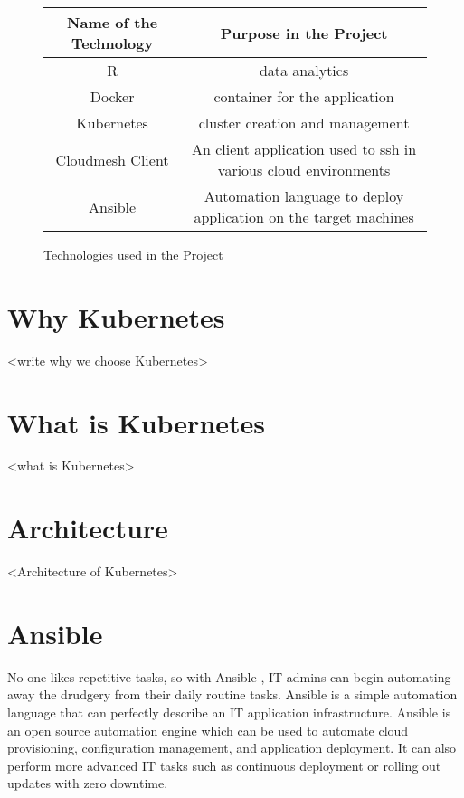 \documentclass[9pt,twocolumn,twoside]{../../styles/osajnl}
\begin{document}
\begin{figure}[ht]
\begin{center}
 \begin{tabular}{|c | c|} 
 \hline
Name of the Technology & Purpose in the Project \\ [0.5ex] 
 \hline\hline
    
R & data analytics \\
\hline

Docker & container for the application \\
\hline

Kubernetes & cluster creation and management \\[1ex]
\hline

Cloudmesh Client & An client application used to ssh in various cloud
environments \\[1ex]

\hline
Ansible & Automation language to deploy
application on the target machines \\[1ex]
\hline

\end{tabular}
\end{center}
  \caption{Technologies used in the Project}
\end{figure}

\section{Why Kubernetes}
<write why we choose Kubernetes>

\section{What is Kubernetes}
<what is Kubernetes>

\section{Architecture}
<Architecture of Kubernetes>

\section{Ansible}
No one likes repetitive tasks, so with Ansible \cite{www-ansible}, IT
admins can begin automating away the drudgery from their daily routine
tasks. Ansible is a simple automation language that can perfectly
describe an IT application infrastructure. Ansible is an open source
automation engine which can be used to automate cloud provisioning,
configuration management, and application deployment. It can also
perform more advanced IT tasks such as continuous deployment or
rolling out updates with zero downtime.
\end{document}
